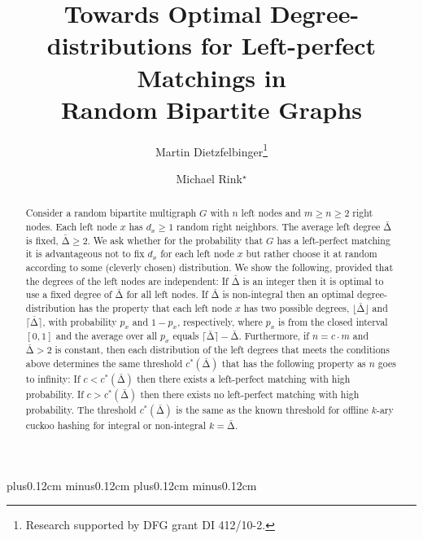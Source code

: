 \let\accentvec\vec \documentclass{llncs}
\newcommand{\degr}{\ensuremath{d}}
\newcommand{\keys}{\ensuremath{n}}
\newcommand{\cells}{\ensuremath{m}}
\newcommand{\mean}{{\mathrm{\scriptstyle\Delta}}}
\newcommand{\Amean}{\bar{\mean}}
\newcommand{\floor}[1]{\ensuremath{\lfloor #1\rfloor}}
\newcommand{\ceil}[1]{\ensuremath{\lceil #1\rceil}}
\newcommand{\graph}{\ensuremath{G}}
\begin{document}
  plus0.12cm minus0.12cm
  plus0.12cm minus0.12cm

\title{Towards Optimal Degree-distributions for Left-perfect Matchings in\texorpdfstring{\\}{}Random Bipartite Graphs}
\author{Martin Dietzfelbinger\thanks{Research supported by DFG grant DI 412/10-2.} \and Michael Rink$^{\star}$}


\maketitle
\begin{abstract}
\vspace{-0.4cm}
Consider a random bipartite multigraph $\graph$ with $\keys$ left nodes and $\cells \geq \keys\geq2$
right nodes. Each left node $x$ has $\degr_x\geq1$ random right neighbors.
The average left degree $\Amean$ is fixed, $\Amean\geq2$.
We ask whether for the probability that $\graph$ has a left-perfect matching
it is advantageous not to fix $\degr_x$ for each left node $x$ but rather choose it
at random according to some (cleverly chosen) distribution. We show the following,
provided that the degrees of the left nodes are independent: 
If $\Amean$ is an integer then it is optimal to use a fixed degree of $\Amean$ for all left nodes.
If $\Amean$ is non-integral then an optimal degree-distribution has the property that
each left node $x$ has two possible degrees, $\floor{\Amean}$ and $\ceil{\Amean}$,
with probability $p_x$ and $1-p_x$, respectively, where $p_x$ is from the closed interval~$[0,1]$
and the average over all $p_x$ equals $\ceil{\Amean}-\Amean$.
Furthermore, if $\keys=c\cdot \cells$ and $\Amean>2$ is constant,
then each distribution of the left degrees that meets the conditions above determines the same
threshold $c^*(\Amean)$ that has the following property as $\keys$ goes to infinity:
If $c<c^*(\Amean)$ then there exists a left-perfect matching with high probability.
If $c>c^*(\Amean)$ then there exists no left-perfect matching with high probability.
The threshold $c^*(\Amean)$ is the same as the known threshold for offline $k$-ary cuckoo hashing
for integral or non-integral $k=\Amean$.
\vspace{-0.1cm}
\end{abstract}
\end{document}
